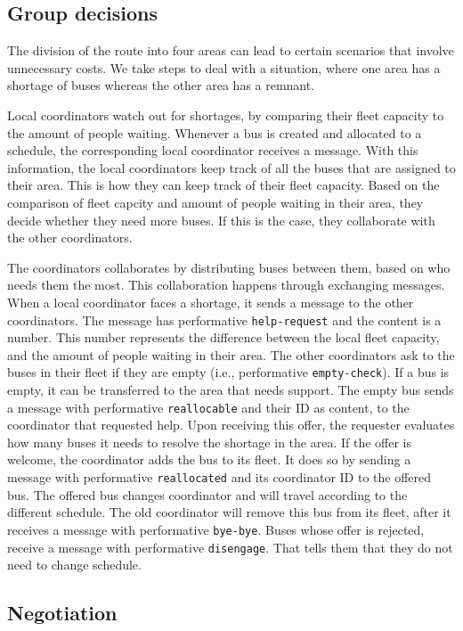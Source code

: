 \subsection{Group decisions}

The division of the route into four areas can lead to certain scenarios that involve unnecessary costs. We take steps to deal with a situation, where one area has a shortage of buses whereas the other area has a remnant. 

Local coordinators watch out for shortages, by comparing their fleet capacity to the amount of people waiting. Whenever a bus is created and allocated to a schedule, the corresponding local coordinator receives a message. With this information, the local coordinators keep track of all the buses that are assigned to their area. This is how they can keep track of their fleet capacity. Based on the comparison of fleet capcity and amount of people waiting in their area, they decide whether they need more buses. If this is the case, they collaborate with the other coordinators. 

The coordinators collaborates by distributing buses between them, based on who needs them the most. This collaboration happens through exchanging messages. When a local coordinator faces a shortage, it sends a message to the other coordinators. The message has performative \texttt{help-request} and the content is a number. This number represents the difference between the local fleet capacity, and the amount of people waiting in their area. The other coordinators ask to the buses in their fleet if they are empty (i.e., performative \texttt{empty-check}). If a bus is empty, it can be transferred to the area that needs support. The empty bus sends a message with performative \texttt{reallocable} and their ID as content, to the coordinator that requested help. Upon receiving this offer, the requester evaluates how many buses it needs to resolve the shortage in the area. If the offer is welcome, the coordinator adds the bus to its fleet. It does so by sending a message with performative \texttt{reallocated} and its coordinator ID to the offered bus. The offered bus changes coordinator and will travel according to the different schedule. The old coordinator will remove this bus from its fleet, after it receives a message with performative \texttt{bye-bye}. Buses whose offer is rejected, receive a message with performative \texttt{disengage}. That tells them that they do not need to change schedule. 

\subsection{Negotiation}
\label{subsec:negotiations}

